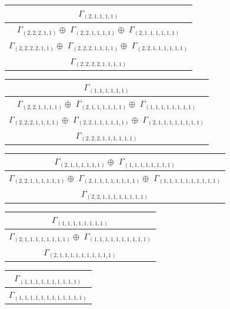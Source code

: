 \documentclass[main.tex]{subfiles}
\begin{document}
\begin{minipage}{.4\textwidth}
\centering
\begin{tabular}{c}
$\Gamma_{(
2 , 
1 , 
1 , 
1 , 
1
)}$
\\ \hline
$\Gamma_{(
2 , 
2 , 
2 , 
1 , 
1
)} \oplus$
$\Gamma_{(
2 , 
2 , 
1 , 
1 , 
1 , 
1
)} \oplus$
$\Gamma_{(
2 , 
1 , 
1 , 
1 , 
1 , 
1 , 
1
)}$
\\ \hline
$\Gamma_{(
2 , 
2 , 
2 , 
2 , 
1 , 
1
)} \oplus$
$\Gamma_{(
2 , 
2 , 
2 , 
1 , 
1 , 
1 , 
1
)} \oplus$
$\Gamma_{(
2 , 
2 , 
1 , 
1 , 
1 , 
1 , 
1 , 
1
)}$
\\ \hline
$\Gamma_{(
2 , 
2 , 
2 , 
2 , 
1 , 
1 , 
1 , 
1
)}$
\\
\end{tabular}\end{minipage}
\bigskip
\begin{minipage}{.5\textwidth}
\centering
\begin{tabular}{c}
$\Gamma_{(
1 , 
1 , 
1 , 
1 , 
1 , 
1
)}$
\\ \hline
$\Gamma_{(
2 , 
2 , 
1 , 
1 , 
1 , 
1
)} \oplus$
$\Gamma_{(
2 , 
1 , 
1 , 
1 , 
1 , 
1 , 
1
)} \oplus$
$\Gamma_{(
1 , 
1 , 
1 , 
1 , 
1 , 
1 , 
1 , 
1
)}$
\\ \hline
$\Gamma_{(
2 , 
2 , 
2 , 
1 , 
1 , 
1 , 
1
)} \oplus$
$\Gamma_{(
2 , 
2 , 
1 , 
1 , 
1 , 
1 , 
1 , 
1
)} \oplus$
$\Gamma_{(
2 , 
1 , 
1 , 
1 , 
1 , 
1 , 
1 , 
1 , 
1
)}$
\\ \hline
$\Gamma_{(
2 , 
2 , 
2 , 
1 , 
1 , 
1 , 
1 , 
1 , 
1
)}$
\\
\end{tabular}\end{minipage}
\begin{minipage}{.5\textwidth}
\centering
\begin{tabular}{c}
$\Gamma_{(
2 , 
1 , 
1 , 
1 , 
1 , 
1 , 
1
)} \oplus$
$\Gamma_{(
1 , 
1 , 
1 , 
1 , 
1 , 
1 , 
1 , 
1
)}$
\\ \hline
$\Gamma_{(
2 , 
2 , 
1 , 
1 , 
1 , 
1 , 
1 , 
1
)} \oplus$
$\Gamma_{(
2 , 
1 , 
1 , 
1 , 
1 , 
1 , 
1 , 
1 , 
1
)} \oplus$
$\Gamma_{(
1 , 
1 , 
1 , 
1 , 
1 , 
1 , 
1 , 
1 , 
1 , 
1
)}$
\\ \hline
$\Gamma_{(
2 , 
2 , 
1 , 
1 , 
1 , 
1 , 
1 , 
1 , 
1 , 
1
)}$
\\
\end{tabular}\end{minipage}
\bigskip
\begin{minipage}{.5\textwidth}
\centering
\begin{tabular}{c}
$\Gamma_{(
1 , 
1 , 
1 , 
1 , 
1 , 
1 , 
1 , 
1
)}$
\\ \hline
$\Gamma_{(
2 , 
1 , 
1 , 
1 , 
1 , 
1 , 
1 , 
1 , 
1
)} \oplus$
$\Gamma_{(
1 , 
1 , 
1 , 
1 , 
1 , 
1 , 
1 , 
1 , 
1 , 
1
)}$
\\ \hline
$\Gamma_{(
2 , 
1 , 
1 , 
1 , 
1 , 
1 , 
1 , 
1 , 
1 , 
1 , 
1
)}$
\\
\end{tabular}\end{minipage}
\begin{minipage}{.5\textwidth}
\centering
\begin{tabular}{c}
$\Gamma_{(
1 , 
1 , 
1 , 
1 , 
1 , 
1 , 
1 , 
1 , 
1 , 
1
)}$
\\ \hline
$\Gamma_{(
1 , 
1 , 
1 , 
1 , 
1 , 
1 , 
1 , 
1 , 
1 , 
1 , 
1 , 
1
)}$
\\
\end{tabular}\end{minipage}
\end{document}
